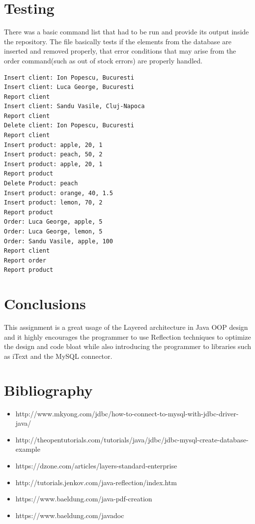\documentclass[10pt,a4paper]{article}
\begin{document}
\section{Testing}
There was a basic command list that had to be run and provide its output inside the repository. The file basically tests if the elements from the database are inserted and removed properly, that error conditions that may arise from the order command(such as out of stock errors) are properly handled.
\begin{verbatim}
Insert client: Ion Popescu, Bucuresti
Insert client: Luca George, Bucuresti
Report client
Insert client: Sandu Vasile, Cluj-Napoca
Report client
Delete client: Ion Popescu, Bucuresti
Report client
Insert product: apple, 20, 1
Insert product: peach, 50, 2
Insert product: apple, 20, 1
Report product
Delete Product: peach
Insert product: orange, 40, 1.5
Insert product: lemon, 70, 2
Report product
Order: Luca George, apple, 5
Order: Luca George, lemon, 5
Order: Sandu Vasile, apple, 100
Report client
Report order
Report product
\end{verbatim}
\section{Conclusions}
This assignment is a great usage of the Layered architecture in Java OOP design and it highly encourages the programmer to use Reflection techniques to optimize the design and code bloat while also introducing the programmer to libraries such as iText and the MySQL connector.
\section{Bibliography}
\begin{itemize}
\item http://www.mkyong.com/jdbc/how-to-connect-to-mysql-with-jdbc-driver-java/
\item http://theopentutorials.com/tutorials/java/jdbc/jdbc-mysql-create-database-example
\item https://dzone.com/articles/layers-standard-enterprise
\item http://tutorials.jenkov.com/java-reflection/index.htm
\item https://www.baeldung.com/java-pdf-creation
\item https://www.baeldung.com/javadoc

\end{itemize}
\end{document}
